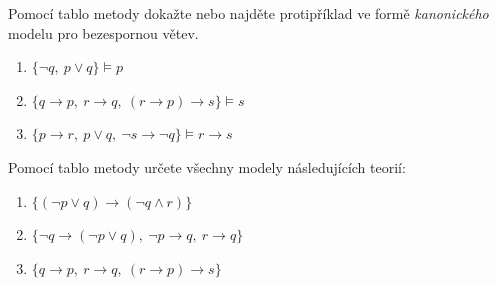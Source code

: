 \documentclass[a4paper,12pt]{article}
\begin{document}
\medskip\begin{problem}
    Pomocí tablo metody dokažte nebo najděte protipříklad ve formě \emph{kanonického} modelu pro bezespornou větev.
    \begin{enumerate}
    \item $\{ \neg q,\ p \vee q\} \models p$
    \item $\{ q \to p,\ r \to q,\ (r \to p) \to s\} \models s$
    \item $\{ p \to r,\ p \vee q,\ \neg s \to \neg q\} \models r \to s$
    \end{enumerate}
\end{problem}
  

\medskip\begin{problem}
    Pomocí tablo metody určete všechny modely následujících teorií:
    \begin{enumerate}
    \item $\{(\neg p \vee q) \to (\neg q \wedge r)\}$
    \item $\{\neg q \to (\neg p \vee q),\ \neg p \to q,\ r \to q\}$
    \item $\{ q \to p,\ r \to q,\ (r \to p) \to s\}$
    \end{enumerate}
\end{problem}
\end{document}
